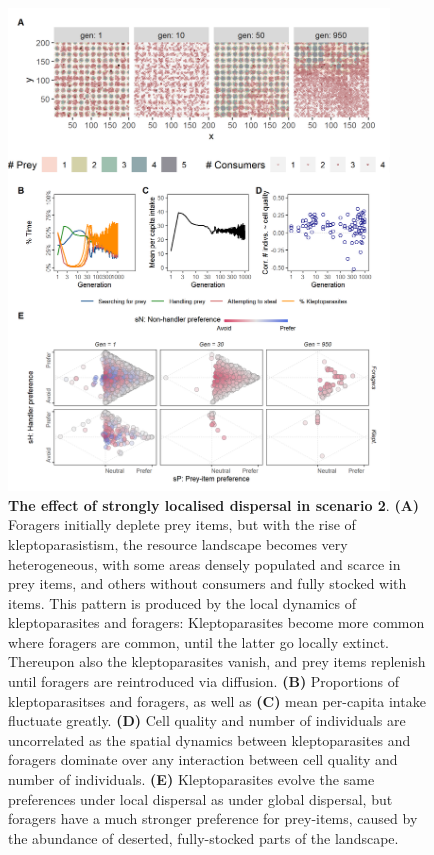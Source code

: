 {\begin{figure}
\centering
\includegraphics[width=0.9\textwidth]{figures/kleptomove/fig_local_dispersal_sc_02.png}
\caption{\textbf{The effect of strongly localised dispersal in scenario 2}. \textbf{(A)} Foragers initially deplete prey items, but with the rise of kleptoparasistism, the resource landscape becomes very heterogeneous, with some areas densely populated and scarce in prey items, and others without consumers and fully stocked with items. This pattern is produced by the local dynamics of kleptoparasites and foragers: Kleptoparasites become more common where foragers are common, until the latter go locally extinct. Thereupon also the kleptoparasites vanish, and prey items replenish until foragers are reintroduced via diffusion. \textbf{(B)} Proportions of kleptoparasitses and foragers, as well as \textbf{(C)} mean per-capita intake fluctuate greatly. \textbf{(D)} Cell quality and number of individuals are uncorrelated as the spatial dynamics between kleptoparasites and foragers dominate over any interaction between cell quality and number of individuals. \textbf{(E)} Kleptoparasites evolve the same preferences under local dispersal as under global dispersal, but foragers have a much stronger preference for prey-items, caused by the abundance of deserted, fully-stocked parts of the landscape.}
\end{figure}

{ \begin{center}  \end{center} }

\endgroup
